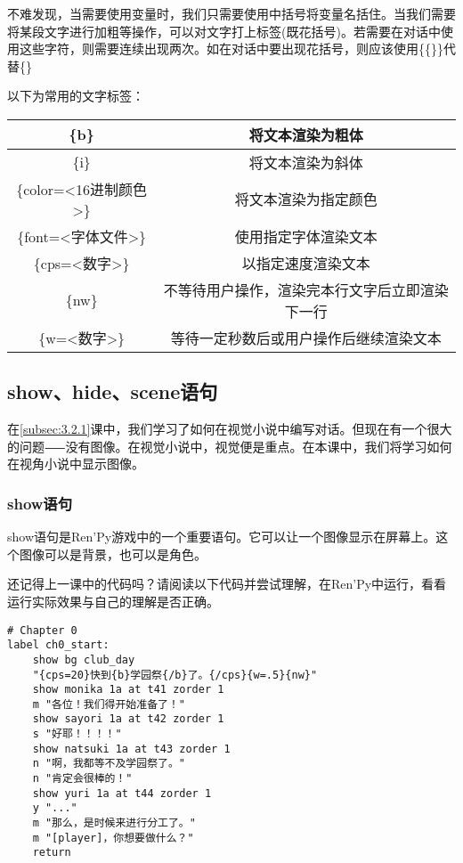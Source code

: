 不难发现，当需要使用变量时，我们只需要使用中括号将变量名括住。当我们需要将某段文字进行加粗等操作，可以对文字打上标签(既花括号)。若需要在对话中使用这些字符，则需要连续出现两次。如在对话中要出现花括号，则应该使用\{\{\}\}代替\{\}

以下为常用的文字标签：
\begin{center}
    \tabletail{\hline}
    \tablelasttail{\hline}
    \begin{supertabular}{|c|c|}
        \hline
        \{b\} & 将文本渲染为粗体 \\
        \hline
        \{i\} & 将文本渲染为斜体 \\
        \hline
        \{color=<16进制颜色>\} & 将文本渲染为指定颜色 \\
        \hline
        \{font=<字体文件>\} & 使用指定字体渲染文本 \\
        \hline
        \{cps=<数字>\} & 以指定速度渲染文本 \\
        \hline
        \{nw\} & 不等待用户操作，渲染完本行文字后立即渲染下一行 \\
        \hline
        \{w=<数字>\} & 等待一定秒数后或用户操作后继续渲染文本 \\
        \hline
    \end{supertabular}
    \label{table:3.2.1}
\end{center}

\subsection{show、hide、scene语句}

在\ref{subsec:3.2.1}课中，我们学习了如何在视觉小说中编写对话。但现在有一个很大的问题⸺没有图像。在视觉小说中，视觉便是重点。在本课中，我们将学习如何在视角小说中显示图像。

\subsubsection{show语句}

show语句是Ren'Py游戏中的一个重要语句。它可以让一个图像显示在屏幕上。这个图像可以是背景，也可以是角色。

还记得上一课中的代码吗？请阅读以下代码并尝试理解，在Ren'Py中运行，看看运行实际效果与自己的理解是否正确。

\begin{lstlisting}[caption=script-ch1.rpy, label={lst:2.3}]
# Chapter 0
label ch0_start:
    show bg club_day
    "{cps=20}快到{b}学园祭{/b}了。{/cps}{w=.5}{nw}"
    show monika 1a at t41 zorder 1
    m "各位！我们得开始准备了！"
    show sayori 1a at t42 zorder 1
    s "好耶！！！！"
    show natsuki 1a at t43 zorder 1
    n "啊，我都等不及学园祭了。"
    n "肯定会很棒的！"
    show yuri 1a at t44 zorder 1
    y "..."
    m "那么，是时候来进行分工了。"
    m "[player]，你想要做什么？"
    return
\end{lstlisting}

